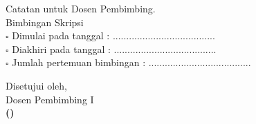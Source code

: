 Catatan untuk Dosen Pembimbing.\\
Bimbingan Skripsi\\
$\square$ Dimulai pada tanggal \hspace{2cm}: ......................................\\
$\square$ Diakhiri pada tanggal \hspace{2cm}: ......................................\\
$\square$ Jumlah pertemuan bimbingan \hspace{0.5cm}: ......................................\\[1cm]
\begin{flushright}
Disetujui oleh,\\
Dosen Pembimbing I\\[1.5cm]
\textbf{(\underline{\DosenPembimbingI})}
\end{flushright}
